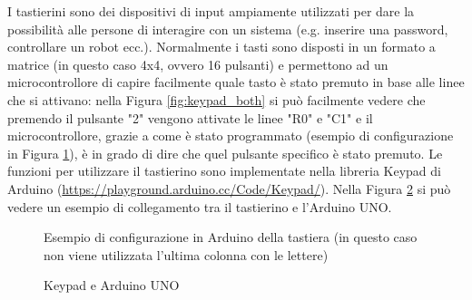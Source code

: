 \documentclass[12pt]{report}
\begin{document}
I tastierini sono dei dispositivi di input ampiamente utilizzati per dare la possibilità alle persone di interagire con un sistema (e.g. inserire una password, controllare un robot ecc.). Normalmente i tasti sono disposti in un formato a matrice (in questo caso 4x4, ovvero 16 pulsanti) e permettono ad un microcontrollore di capire facilmente quale tasto è stato premuto in base alle linee che si attivano: nella Figura \ref{fig:keypad_both} si può facilmente vedere che premendo il pulsante "2" vengono attivate le linee "R0" e "C1" e il microcontrollore, grazie a come è stato programmato (esempio di configurazione in Figura \ref{fig:keypad_config}), è in grado di dire che quel pulsante specifico è stato premuto. Le funzioni per utilizzare il tastierino sono implementate nella libreria Keypad di Arduino (\url{https://playground.arduino.cc/Code/Keypad/}). Nella Figura \ref{fig:keypad_uno} si può vedere un esempio di collegamento tra il tastierino e l'Arduino UNO.


\begin{figure}
	\caption{Esempio di configurazione in Arduino della tastiera (in questo caso non viene utilizzata l'ultima colonna con le lettere)}
	\label{fig:keypad_config}
\end{figure}

\begin{figure}
	\caption{Keypad e Arduino UNO}
	\label{fig:keypad_uno}
\end{figure}
\end{document}
